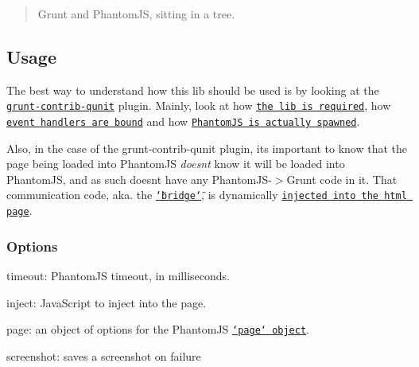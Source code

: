 \begin{quote}
Grunt and Phantom\+J\+S, sitting in a tree. \end{quote}


\subsection*{Usage}

The best way to understand how this lib should be used is by looking at the \href{https://github.com/gruntjs/grunt-contrib-qunit}{\tt grunt-\/contrib-\/qunit} plugin. Mainly, look at how \href{https://github.com/gruntjs/grunt-contrib-qunit/blob/d99291713d32f84e50303d6e51eb2dab40b1deb6/tasks/qunit.js#L17}{\tt the lib is required}, how \href{https://github.com/gruntjs/grunt-contrib-qunit/blob/d99291713d32f84e50303d6e51eb2dab40b1deb6/tasks/qunit.js#L61-L144}{\tt event handlers are bound} and how \href{https://github.com/gruntjs/grunt-contrib-qunit/blob/d99291713d32f84e50303d6e51eb2dab40b1deb6/tasks/qunit.js#L177-L190}{\tt Phantom\+J\+S is actually spawned}.

Also, in the case of the grunt-\/contrib-\/qunit plugin, it\textquotesingle{}s important to know that the page being loaded into Phantom\+J\+S {\itshape doesn\textquotesingle{}t} know it will be loaded into Phantom\+J\+S, and as such doesn\textquotesingle{}t have any Phantom\+J\+S-\/$>$Grunt code in it. That communication code, aka. the \href{https://github.com/gruntjs/grunt-contrib-qunit/blob/d99291713d32f84e50303d6e51eb2dab40b1deb6/phantomjs/bridge.js}{\tt \char`\"{}bridge\char`\"{}}, is dynamically \href{https://github.com/gruntjs/grunt-contrib-qunit/blob/d99291713d32f84e50303d6e51eb2dab40b1deb6/tasks/qunit.js#L152}{\tt injected into the html page}.

\subsubsection*{Options}


\begin{DoxyItemize}
\item {\ttfamily timeout}\+: Phantom\+J\+S\textquotesingle{} timeout, in milliseconds.
\item {\ttfamily inject}\+: Java\+Script to inject into the page.
\item {\ttfamily page}\+: an object of options for the Phantom\+J\+S \href{https://github.com/ariya/phantomjs/wiki/API-Reference-WebPage}{\tt `page` object}.
\item {\ttfamily screenshot}\+: saves a screenshot on failure
\end{DoxyItemize}

